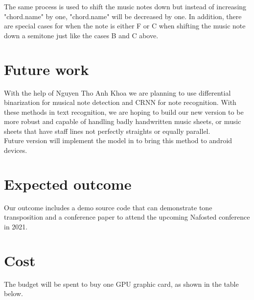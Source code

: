 \documentclass[a4paper,12pt]{report}
\begin{document}
The same process is used to shift the music notes down but instead of increasing
"chord.name" by one, "chord.name" will be decreased by one. In addition, there are
special cases for when the note is either F or C when shifting the music note
down a semitone just like the cases B and C above.


\section{Future work}
With the help of Nguyen Tho Anh Khoa we are
planning to use differential binarization for musical note detection and CRNN
for note recognition. With these methods in text recognition, we are hoping to
build our new version to be more robust and capable of handling badly handwritten music
sheets, or music sheets that have staff lines not perfectly straights or
equally parallel.\\

Future version will implement the model in
\textcite{Pacha2017} to bring this method to android devices.

\section{Expected outcome}




Our outcome includes a demo source code that can demonstrate tone transposition and a conference
paper to attend the upcoming Nafosted conference in 2021.

\clearpage

\section{Cost}
The budget will be spent to buy one GPU graphic card, as shown in the table below.
\end{document}
